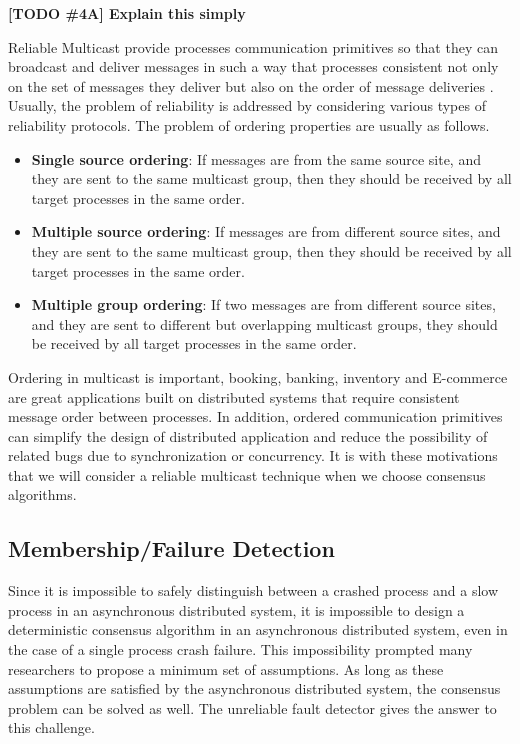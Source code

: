 \documentclass[12pt, a4paper]{article}
\newcommand{\todo}[2]{\textbf{\color{blue}[TODO \##1] #2}\par}
\begin{document}
\todo{4A}{Explain this simply}

Reliable Multicast provide processes communication primitives so that they can
broadcast and deliver messages in such a way that processes consistent not only
on the set of messages they deliver but also on the order of message deliveries
\cite{fritzke2001consensus}. Usually, the problem of reliability is addressed by
considering various types of reliability protocols. The problem of ordering
properties are usually as follows.\cite{garcia1991ordered}

\begin{itemize}
  \item \textbf{Single source ordering}: If messages are from the same source
  site, and they are sent to the same multicast group, then they should be
  received by all target processes in the same order.
  \item \textbf{Multiple source ordering}: If messages are from different
  source sites, and they are sent to the same multicast group,
  then they should be received by all target processes in the same order.
  \item \textbf{Multiple group ordering}: If two messages are from different
  source sites, and they are sent to different but overlapping multicast groups,
  they should be received by all target processes in the same order.
\end{itemize}

Ordering in multicast is important, booking, banking, inventory and E-commerce
are great applications built on distributed systems that require consistent
message order between processes. In addition, ordered communication primitives
can simplify the design of distributed application and reduce the possibility of
related bugs due to synchronization or concurrency\cite{garcia1991ordered}. It
is with these motivations that we will consider a reliable multicast technique
when we choose consensus algorithms.

\subsection{Membership/Failure Detection}
Since it is impossible to safely distinguish between a crashed process and a
slow process in an asynchronous distributed system, it is impossible to design
a deterministic consensus algorithm in an asynchronous distributed system, even
in the case of a single process crash failure\cite{fischer1985impossibility}.
This impossibility prompted many researchers to propose a minimum set of
assumptions. As long as these assumptions are satisfied by the asynchronous
distributed system, the consensus problem can be solved as well. The unreliable
fault detector gives the answer to this challenge\cite{chandra1996unreliable}.
\end{document}
